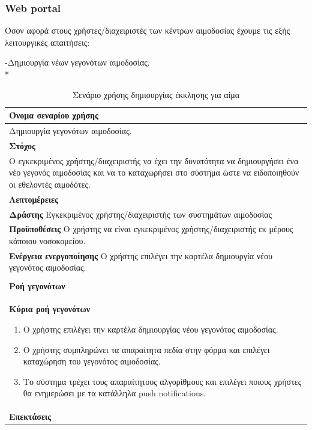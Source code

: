  \subsubsection{Web portal}

Όσον αφορά στους χρήστες/διαχειριστές των κέντρων αιμοδοσίας έχουμε τις εξής λειτουργικές απαιτήσεις:




-Δημιουργία νέων γεγονότων αιμοδοσίας.
\\*
\begin{table}[H]
	\begin{center}
	    \begin{tabular}{|p{\dimexpr \linewidth-2\tabcolsep}|}
	    \hline
	    \rowcolor{grayy}
	    \textbf{Όνομα σεναρίου χρήσης}
	    \\ \hline    
	    Δημιουργία γεγονότων αιμοδοσίας.
	     \\ \hline
	    \rowcolor{grayy}
	    \textbf{\textbf{Στόχος}}
	    \\ \hline
	 	 Ο εγκεκριμένος χρήστης/διαχειριστής να έχει την δυνατότητα να δημιουργήσει ένα νέο γεγονός αιμοδοσίας και να το καταχωρήσει στο σύστημα ώστε να ειδοποιηθούν οι εθελοντές αιμοδότες.
	    \\ \hline
	    \rowcolor{grayy}
	    \textbf{Λεπτομέρειες}
	    \\ \hline
		\textbf{Δράστης} Εγκεκριμένος χρήστης/διαχειριστής των συστημάτων αιμοδοσίας
		\\*
		\textbf{Προϋποθέσεις} Ο χρήστης να είναι εγκεκριμένος χρήστης/διαχειριστής εκ μέρους κάποιου νοσοκομείου.
		\\*
		\textbf{Ενέργεια ενεργοποίησης} Ο χρήστης επιλέγει την καρτέλα δημιουργία νέου γεγονότος αιμοδοσίας.
		\\ \hline
	    \\ \hline
		\rowcolor{grayy}    
	    \textbf{Ροή γεγονότων}
	    \\* 
		\textbf{Κύρια ροή γεγονότων}
		\begin{enumerate}
		\item	 Ο χρήστης επιλέγει την καρτέλα δημιουργίας νέου γεγονότος αιμοδοσίας.
		\item Ο χρήστης συμπληρώνει τα απαραίτητα πεδία στην φόρμα και επιλέγει καταχώρηση του γεγονότος αιμοδοσίας.
		\item Το σύστημα τρέχει τους απαραίτητους αλγορίθμους και επιλέγει ποιους χρήστες θα ενημερώσει με τα κατάλληλα push notifications.
		\end{enumerate}
		\\*
		\textbf{Επεκτάσεις}
		   \\ \hline
	    \end{tabular}
	    \caption{Σενάριο χρήσης δημιουργίας έκκλησης για αίμα}
	    \label{tab:create_blood_donor_event} 
	\end{center}
\end{table}

